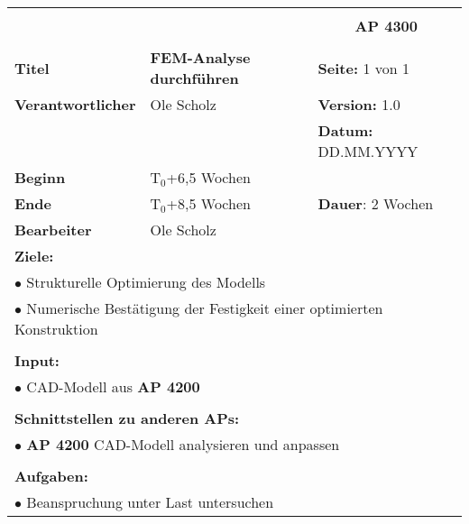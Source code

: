 \clearpage
\begin{table}[!h]
	\begin{center}
		\begin{tabular}{|p{35mm}||p{55mm}|p{50mm}||p{40mm}|}
			\hline
			\multicolumn{3}{|l||}{\textbf{}} & \multicolumn{1}{c|}{}\\
			\multicolumn{3}{|l||}{\textbf{}} & \multicolumn{1}{c|}{\textbf{AP 4300}}\\
			\multicolumn{3}{|l||}{\textbf{}} & \multicolumn{1}{c|}{}\\
			\hline\hline
			\textbf{Titel} & \multicolumn{2}{p{7cm}||}{\textbf{FEM-Analyse durchführen}} 
			& \textbf{Seite:} 1 von 1\\
			\hline
			\textbf{Verantwortlicher} & \multicolumn{2}{l||}{Ole Scholz} & \textbf{Version:} 1.0\\
			\hline
			\multicolumn{3}{|l||}{} & \textbf{Datum:} DD.MM.YYYY\\
			\hline\hline
			\textbf{Beginn} & \multicolumn{2}{l||}{T$_0$+6,5 Wochen} & \\
			\hline
			\textbf{Ende} & \multicolumn{2}{l||}{T$_0$+8,5 Wochen} & \textbf{Dauer}: 2 Wochen\\
			\hline\hline
			\textbf{Bearbeiter} & \multicolumn{3}{l|}{Ole Scholz}\\
			\hline\hline
			\multicolumn{4}{|p{150mm}|}{\textbf{Ziele:}}\\
			\multicolumn{4}{|p{150mm}|}{$\bullet$ Strukturelle Optimierung des Modells}\\
			\multicolumn{4}{|p{150mm}|}{$\bullet$ Numerische Bestätigung der Festigkeit einer optimierten Konstruktion}\\
			\multicolumn{4}{|p{150mm}|}{}\\
			\multicolumn{4}{|p{150mm}|}{\textbf{Input:}}\\
			\multicolumn{4}{|p{150mm}|}{$\bullet$ CAD-Modell aus \textbf{AP 4200}}\\
			\multicolumn{4}{|p{150mm}|}{}\\
			\multicolumn{4}{|p{150mm}|}{\textbf{Schnittstellen zu anderen APs:}}\\
			\multicolumn{4}{|p{150mm}|}{$\bullet$ \textbf{AP 4200} CAD-Modell analysieren und anpassen}\\
			\multicolumn{4}{|p{150mm}|}{}\\
			\multicolumn{4}{|p{150mm}|}{\textbf{Aufgaben:}}\\
			\multicolumn{4}{|p{150mm}|}{$\bullet$ Beanspruchung unter Last untersuchen}\\

\end{tabular}
\end{center}
\end{table}

